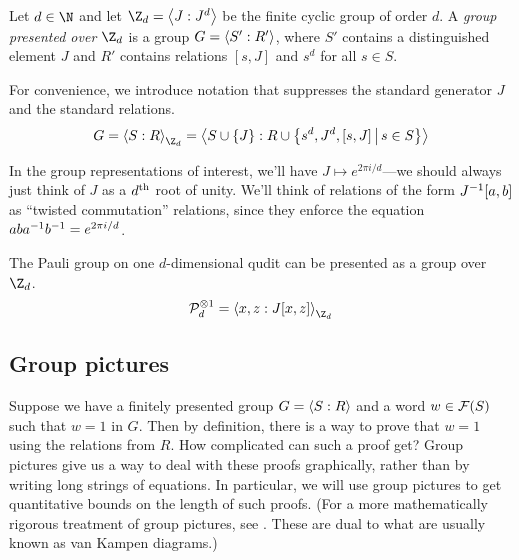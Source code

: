 \begin{definition}
	Let $d\in \N$ and let $\Z_d = \Braket{J:J^d}$ be the finite cyclic group of order $d$. A \emph{group presented over $\Z_d$} is a group $G = \Braket{S':R'}$, where $S'$ contains a distinguished element $J$ and $R'$ contains relations $[s,J]$ and $s^d$ for all $s\in S$.
	
	For convenience, we introduce notation that suppresses the standard generator $J$ and the standard relations.
	\begin{equation}
		G= \Braket{S:R}_{\Z_d} = \Braket{
		S\cup\set{ J } : R \cup \set{ s^d,J^d,[s,J] \; s\in S }
		}
	\end{equation}
\end{definition}
In the group representations of interest, we'll have $J \mapsto e^{2\pi i/d}$---we should always just think of $J$ as a $d\textsuperscript{th}$ root of unity. We'll think of relations of the form $J^{-1}[a,b]$ as ``twisted commutation'' relations, since they enforce the equation $aba^{-1}b^{-1} = e^{2\pi i/d}$.

\begin{example}\label{example:P_d}
	The Pauli group on one $d$-dimensional qudit can be presented as a group over $\Z_{d}$. 
	\begin{equation}
	\m P_d^{\otimes 1} = \Braket{x,z: J[x,z]}_{\Z_{d}}
	\end{equation}
\end{example}

\subsection{Group pictures}\label{subsection:van-kampen-diagrams}

Suppose we have a finitely presented group $G = \braket{S:R}$ and a word $w\in \mathcal F(S)$ such that $w = 1$ in $G$. 
Then by definition, there is a way to prove that $w = 1$ using the relations from $R$. How complicated can such a proof get? Group pictures give us a way to deal with these proofs graphically, rather than by writing long strings of equations.
In particular, we will use group pictures to get quantitative bounds on the length of such proofs. (For a more mathematically rigorous treatment of group pictures, see \cite{slofstra2016tsirelson}. These are dual to what are usually known as van Kampen diagrams.) 

